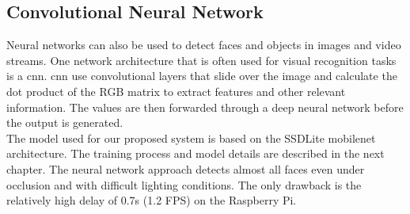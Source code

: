 \subsection{Convolutional Neural Network}
Neural networks can also be used to detect faces and objects in images and video streams. One network architecture that is often used for visual recognition tasks is a \gls{cnn}. \Gls{cnn} use convolutional layers that slide over the image and calculate the dot product of the RGB matrix to extract features and other relevant information. The values are then forwarded through a deep neural network before the output is generated.\\
The model used for our proposed system is based on the SSDLite \gls{mobilenet} architecture. The training process and model details are described in the next chapter. The neural network approach detects almost all faces even under occlusion and with difficult lighting conditions. The only drawback is the relatively high delay of 0.7s (1.2 FPS) on the Raspberry Pi. 

